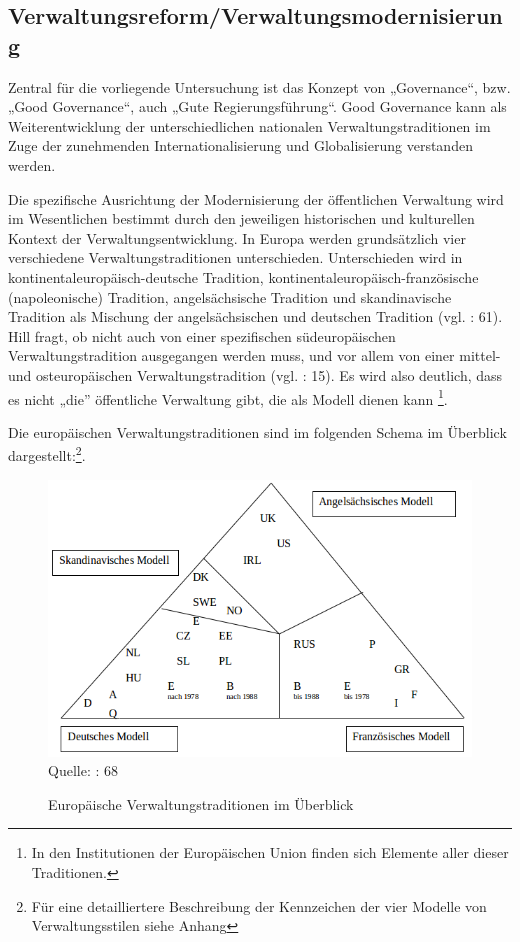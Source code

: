 \subsection{Verwaltungsreform/Verwaltungsmodernisierung }
Zentral für die vorliegende Untersuchung ist das Konzept von „Governance“, bzw. „Good Governance“, auch „Gute Regierungsführung“. Good Governance kann als Weiterentwicklung der unterschiedlichen nationalen Verwaltungstraditionen im Zuge der zunehmenden Internationalisierung und Globalisierung verstanden werden.
\par
Die spezifische Ausrichtung der Modernisierung der öffentlichen Verwaltung wird im Wesentlichen bestimmt durch den jeweiligen historischen und kulturellen Kontext der Verwaltungsentwicklung. In Europa werden grundsätzlich vier verschiedene Verwaltungstraditionen unterschieden. Unterschieden wird in kontinentaleuropäisch-deutsche Tradition, kontinentaleuropäisch-französische (napoleonische) Tradition, angelsächsische Tradition und skandinavische Tradition als Mischung der angelsächsischen und deutschen Tradition (vgl. \cite{lipumb05} : 61). Hill fragt, ob nicht auch von einer spezifischen südeuropäischen Verwaltungstradition ausgegangen werden muss, und vor allem von einer mittel- und osteuropäischen Verwaltungstradition (vgl. \cite{hill06} : 15). Es wird also deutlich, dass es nicht „die” öffentliche Verwaltung gibt, die als Modell dienen kann \footnote{In den Institutionen der Europäischen Union finden sich Elemente aller dieser Traditionen.}.
\par
Die europäischen Verwaltungstraditionen sind im folgenden Schema im Überblick dargestellt:\footnote{Für eine detailliertere Beschreibung der Kennzeichen der vier Modelle von Verwaltungsstilen siehe Anhang }.
\begin{figure}[H]
  \caption{Europäische Verwaltungstraditionen im Überblick}
  \centering
  \includegraphics[width=5in]{Material/VerwaltungsModelle}\\
\scriptsize{Quelle: \cite{lipumb05} : 68}
\end{figure}

